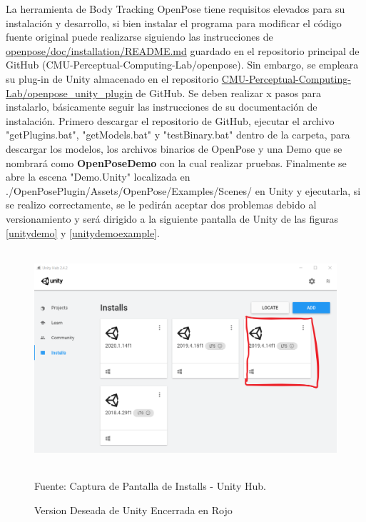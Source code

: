 La herramienta de Body Tracking OpenPose tiene requisitos elevados para su instalación y desarrollo, si bien instalar el programa para modificar el código fuente original puede realizarse siguiendo las instrucciones de  \href{https://github.com/CMU-Perceptual-Computing-Lab/openpose/blob/master/doc/installation/README.md}{openpose/doc/installation/README.md} guardado en el repositorio principal de GitHub (CMU-Perceptual-Computing-Lab/openpose). Sin embargo, se empleara su plug-in de Unity almacenado en el repositorio  \href{https://github.com/CMU-Perceptual-Computing-Lab/openpose\_unity\_plugin}{CMU-Perceptual-Computing-Lab/openpose\_unity\_plugin} de GitHub.
Se deben realizar x pasos para instalarlo, básicamente seguir las instrucciones de su documentación de instalación. Primero descargar el repositorio de GitHub, ejecutar el archivo "getPlugins.bat", "getModels.bat" y "testBinary.bat" dentro de la carpeta, para descargar los modelos, los archivos binarios de OpenPose y una Demo que se nombrará como \textbf{OpenPoseDemo} con la cual realizar pruebas. 
Finalmente se abre la escena "Demo.Unity" localizada en ./OpenPosePlugin/Assets/OpenPose/Examples/Scenes/ en Unity y ejecutarla, si se realizo correctamente, se le pedirán aceptar dos problemas debido al versionamiento y será dirigido a la siguiente pantalla de Unity de las figuras \ref{unitydemo} y \ref{unitydemoexample}.
\begin{figure}[t!]
	\centering
	\includegraphics[width=12cm,height=8cm,]{./Images/installunity.png}
	\caption{Version Deseada de Unity Encerrada en Rojo}
	\footnotesize Fuente: Captura de Pantalla de Installs - Unity Hub.
	\label{installunity}
\end{figure}
